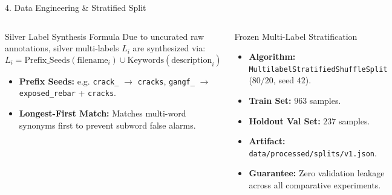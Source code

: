 \documentclass[aspectratio=169]{beamer}
\begin{document}
\begin{frame}{4. Data Engineering \& Stratified Split}
  \begin{columns}
    \begin{block}{Silver Label Synthesis Formula}
      Due to uncurated raw annotations, silver multi-labels $L_i$ are synthesized via:
      $$L_i = \text{Prefix\_Seeds}(\text{filename}_i) \cup \text{Keywords}(\text{description}_i)$$
      \begin{itemize}\footnotesize
        \item \textbf{Prefix Seeds:} e.g. \texttt{crack\_} $\to$ \texttt{cracks}, \texttt{gangf\_} $\to$ \texttt{exposed\_rebar} + \texttt{cracks}.
        \item \textbf{Longest-First Match:} Matches multi-word synonyms first to prevent subword false alarms.
      \end{itemize}
    \end{block}
    \begin{block}{Frozen Multi-Label Stratification}
      \begin{itemize}\footnotesize
        \item \textbf{Algorithm:} \texttt{MultilabelStratifiedShuffleSplit} ($80/20$, seed $42$).
        \item \textbf{Train Set:} $963$ samples.
        \item \textbf{Holdout Val Set:} $237$ samples.
        \item \textbf{Artifact:} \texttt{data/processed/splits/v1.json}.
        \item \textbf{Guarantee:} Zero validation leakage across all comparative experiments.
      \end{itemize}
    \end{block}
  \end{columns}
\end{frame}
\end{document}
